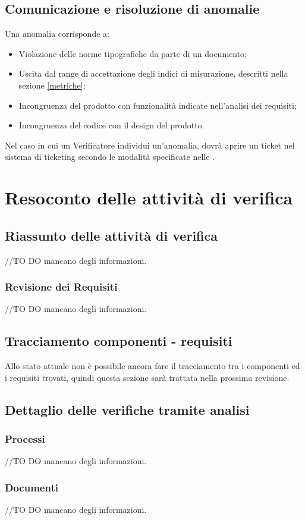 \documentclass[12pt,a4paper]{article}
\begin{document}
\subsection{Comunicazione e risoluzione di anomalie}
Una anomalia corrisponde a:
\begin{itemize}
\item Violazione delle norme tipografiche da parte di un documento;
\item Uscita dal range di accettazione degli indici di misurazione, descritti nella sezione \ref{metriche};
\item Incongruenza del prodotto con funzionalità indicate nell’analisi dei requisiti;
\item Incongruenza del codice con il design del prodotto.
\end{itemize}
Nel caso in cui un Verificatore individui un’anomalia, dovrà aprire un ticket nel sistema di ticketing secondo le modalità specificate nelle \NdP.

\newpage
\appendix
\section{ Resoconto delle attività di verifica}
\subsection{Riassunto delle attività di verifica}
//TO DO \IB mancano degli informazioni.
\subsubsection{Revisione dei Requisiti}
//TO DO \IB mancano degli informazioni.
\subsection{Tracciamento componenti - requisiti}
Allo stato attuale non è possibile ancora fare il tracciamento tra i componenti ed i requisiti trovati, quindi questa sezione sarà trattata nella prossima revisione.
\subsection{Dettaglio delle verifiche tramite analisi}
\subsubsection{Processi}
//TO DO \IB mancano degli informazioni.
\subsubsection{Documenti}
//TO DO \IB mancano degli informazioni.
\end{document}
